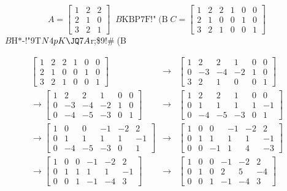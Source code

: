 \begin{eg}
$$A = \left[\begin{array}{ccc} 1 & 2 & 2 \\ 2 & 1 & 0 \\ 3 & 2 & 1 \end{array}\right] 
\;\mbox{$B$KBP$7$F!"(B}\; 
C = \left[\begin{array}{cccccc}1 & 2 & 2 & 1 & 0 & 0 \\ 2 & 1 & 0 & 0 & 1 & 0 \\ 3 & 2 & 1 & 0 & 0 & 1 \end{array}\right]$$
$B$H$*$-!"9T$N4pK\JQ7A$r;\$9!#(B

\begin{eqnarray*}
\left[\begin{array}{cccccc}1 & 2 & 2 & 1 & 0 & 0 \\ 2 & 1 & 0 & 0 & 1 & 0 \\ 3 & 2 & 1 & 0 & 0 & 1 \end{array}\right] & \longrightarrow &\left[\begin{array}{cccccc}1 & 2 & 2 & 1 & 0 & 0 \\ 0 & -3 & -4 & -2 & 1 & 0 \\ 3 & 2 & 1 & 0 & 0 & 1 \end{array}\right]\\
\longrightarrow \left[\begin{array}{cccccc}1 & 2 & 2 & 1 & 0 & 0 \\ 0 & -3 & -4 & -2 & 1 & 0 \\ 0 & -4 & -5 & -3 & 0 & 1 \end{array}\right] & \longrightarrow & 
\left[\begin{array}{cccccc}1 & 2 & 2 & 1 & 0 & 0 \\ 0 & 1 & 1 & 1 & 1 & -1 \\ 0 & -4 & -5 & -3 & 0 & 1 \end{array}\right] \\
\longrightarrow 
\left[\begin{array}{cccccc}1 & 0 & 0 & -1 & -2 & 2 \\ 0 & 1 & 1 & 1 & 1 & -1 \\ 0 & -4 & -5 & -3 & 0 & 1 \end{array}\right] & \longrightarrow &
\left[\begin{array}{cccccc}1 & 0 & 0 & -1 & -2 & 2 \\ 0 & 1 & 1 & 1 & 1 & -1 \\ 0 & 0 & -1 & 1 & 4 & -3 \end{array}\right]\\
\longrightarrow \left[\begin{array}{cccccc}1 & 0 & 0 & -1 & -2 & 2 \\ 0 & 1 & 1 & 1 & 1 & -1 \\ 0 & 0 & 1 & -1 & -4 & 3 \end{array}\right] & \longrightarrow & 
\left[\begin{array}{cccccc}1 & 0 & 0 & -1 & -2 & 2 \\ 0 & 1 & 0 & 2 & 5 & -4 \\ 0 & 0 & 1 & -1 & -4 & 3 \end{array}\right]
\end{eqnarray*}


\end{eg}
